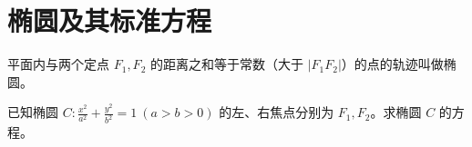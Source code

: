 
\chapter{椭圆及其标准方程}
\begin{problem}[考点：椭圆的定义]
平面内与两个定点 $F_1, F_2$ 的距离之和等于常数（大于 $|F_1F_2|$）的点的轨迹叫做椭圆。
\end{problem}

\begin{problem}[例题]
已知椭圆 $C: \frac{x^2}{a^2} + \frac{y^2}{b^2} = 1 \ (a>b>0)$ 的左、右焦点分别为 $F_1, F_2$。求椭圆 $C$ 的方程。

\end{problem}